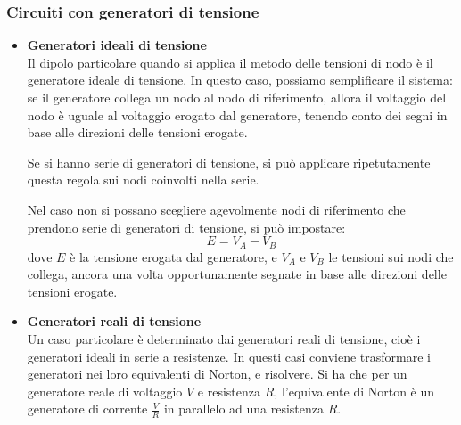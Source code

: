 \documentclass[a4paper,11pt]{article}
\begin{document}
\subsubsection{Circuiti con generatori di tensione}
\begin{itemize}
	\item \textbf{\textsf{Generatori ideali di tensione}} \\
Il dipolo particolare quando si applica il metodo delle tensioni di nodo è il generatore ideale di tensione.
In questo caso, possiamo semplificare il sistema: se il generatore collega un nodo al nodo di riferimento, allora il voltaggio del nodo è uguale al voltaggio erogato dal generatore, tenendo conto dei segni in base alle direzioni delle tensioni erogate.

Se si hanno serie di generatori di tensione, si può applicare ripetutamente questa regola sui nodi coinvolti nella serie.

Nel caso non si possano scegliere agevolmente nodi di riferimento che prendono serie di generatori di tensione, si può impostare:
$$ E = V_A - V_B $$
dove $E$ è la tensione erogata dal generatore, e $V_A$ e $V_B$ le tensioni sui nodi che collega, ancora una volta opportunamente segnate in base alle direzioni delle tensioni erogate.
	\item \textbf{\textsf{Generatori reali di tensione}} \\
Un caso particolare è determinato dai generatori reali di tensione, cioè i generatori ideali in serie a resistenze.
In questi casi conviene trasformare i generatori nei loro equivalenti di Norton, e risolvere.
Si ha che per un generatore reale di voltaggio $V$ e resistenza $R$, l'equivalente di Norton è un generatore di corrente $\frac{V}{R}$ in parallelo ad una resistenza $R$.
\end{itemize}

\TODO
\end{document}
